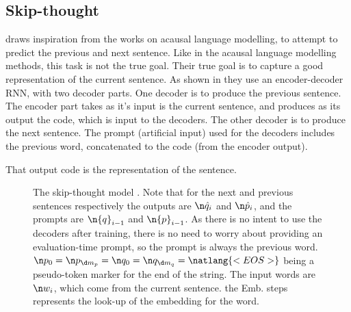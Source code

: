 {\subsection{Skip-thought}
 draws inspiration from the works on acausal language modelling, to attempt to predict the previous and next sentence.
Like in the acausal language modelling methods, this task is not the true goal.
Their true goal is to capture a good representation of the current sentence.
As shown in  they use an encoder-decoder RNN, with two decoder parts.
One decoder is to produce the previous sentence.
The encoder part takes as it's input is the current sentence, and produces as its  output the code,
which is input to the decoders.
The other decoder is to produce the next sentence.
The prompt (artificial input) used for the decoders includes the previous word, concatenated to the code (from the encoder output).

That output code is the representation of the sentence.

\begin{figure}
	\caption{The skip-thought model \parencite{DBLP:journals/corr/KirosZSZTUF15}.
		Note that for the next and previous sentences respectively the outputs are $\n \hat{q}_i$ and $\n \hat{p}_i$,
		and the prompts are $\n {q}_{i-1}$ and $\n {p}_{i-1}$.
		As there is no intent to use the decoders after training, there is no need to worry about providing an evaluation-time prompt, so the prompt is always the previous word.
		$\n p_0= \n p_{\d m_p} = \n q_0= \n q_{\d m_q} =  \natlang{<EOS>}$ being a pseudo-token marker for the end of the string.
		The input words are $\n w_i$, which come from the current sentence.
		the Emb. steps represents the look-up of the embedding for the word.
	}
	\label{fig:skip-thought}
	
\end{figure}}
